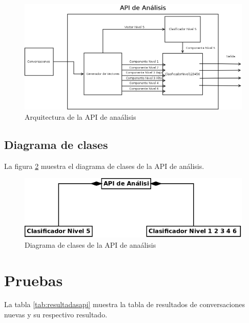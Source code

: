 \begin{figure}[h]
\begin{center}
\includegraphics[scale=.3]{images/api}
\caption{Arquitectura de la API de ana\'alisis}
\label{fig:arquitecturap5}
\end{center}
\end{figure}


\subsection{Diagrama de clases}


La figura \ref{fig:dclasesp5} muestra el diagrama de clases de la API de an\'alisis.
\begin{figure}[h]
\begin{center}
\includegraphics[scale=.5]{images/clasesnivel5}
\caption{Diagrama de clases de la API de ana\'alisis}
\label{fig:dclasesp5}
\end{center}
\end{figure}

\section{Pruebas}


La tabla  \ref{tab:resultadasapi} muestra la tabla de resultados de conversaciones nuevas y su respectivo resultado.

